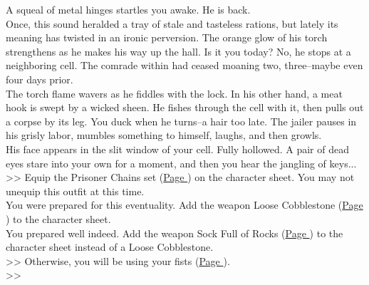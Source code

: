 A squeal of metal hinges startles you awake. He is back.\\

Once, this sound heralded a tray of stale and tasteless rations, but lately its meaning has twisted in an ironic perversion. The orange glow of his torch strengthens as he makes his way up the hall. Is it you today? No, he stops at a neighboring cell. The comrade within had ceased moaning two, three--maybe even four days prior.\\

The torch flame wavers as he fiddles with the lock. In his other hand, a meat hook is swept by a wicked sheen. He fishes through the cell with it, then pulls out a corpse by its leg. You duck when he turns--a hair too late. The jailer pauses in his grisly labor, mumbles something to himself, laughs, and then growls.\\

His face appears in the slit window of your cell. Fully hollowed. A pair of dead eyes stare into your own for a moment, and then you hear the jangling of keys...\\

>> Equip the Prisoner Chains set (\hyperlink{Prisoner Chains}{Page \pageref{Prisoner Chains}}) on the character sheet. You may not unequip this outfit at this time.\\
 You were prepared for this eventuality. Add the weapon Loose Cobblestone (\hyperlink{Loose Cobblestone}{Page \pageref{Loose Cobblestone}}) to the character sheet.\\
 You prepared well indeed. Add the weapon Sock Full of Rocks (\hyperlink{Sock Full of Rocks}{Page \pageref{Sock Full of Rocks}}) to the character sheet instead of a Loose Cobblestone.\\
>> Otherwise, you will be using your fists (\hyperlink{Fist}{Page \pageref{Fist}}).\\

>>